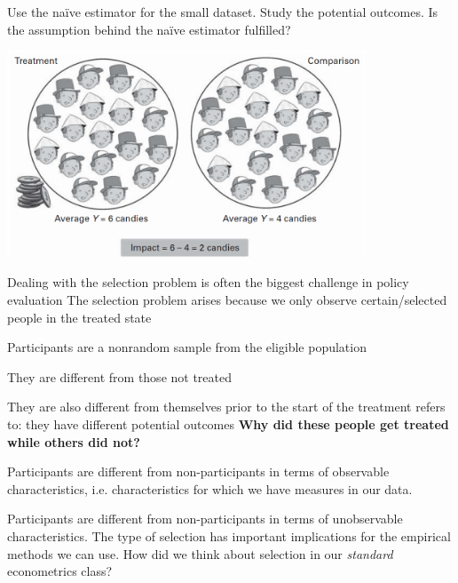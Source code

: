 \documentclass[
  25pt,         %
  a4paper,
  landscape,
  Screen4to3,
  footrule ]{foils}
\newcommand{\xx}{\item[{\small $\bullet$}]}
\begin{document}

\bi
\x Use the na\"{i}ve estimator for the small dataset.
\x Study the potential outcomes. Is the assumption behind the na\"{i}ve estimator fulfilled? 
\ei


\begin{center}
\includegraphics[width=0.8\textwidth]{figures/valid_comparison}
\end{center}


\bi 
\x Dealing with the selection problem is often the biggest challenge in policy evaluation
\vsm
\x The selection problem arises because we only observe certain/selected people in the treated state
\vsm
\bi 
\xx Participants are a nonrandom sample from the eligible population
\xx They are different from those not treated
\xx They are also different from themselves prior to the start of the treatment
\ei
\vsm
{} refers to: they have different potential outcomes
\vsm
\x \textbf{Why did these people get treated while others did not?}
\ei


\bi 
{}
\vsm
\bi 
\xx Participants are different from non-participants in terms of observable characteristics, i.e. characteristics for which we have measures in our data.
\ei
{}
\vsm
\bi 
\xx Participants are different from non-participants in terms of unobservable characteristics.
\ei
\vsm
\x The type of selection has important implications for the empirical methods we can use.
\vsm
\x How did we think about selection in our \textit{standard} econometrics class?
\ei
\end{document}
